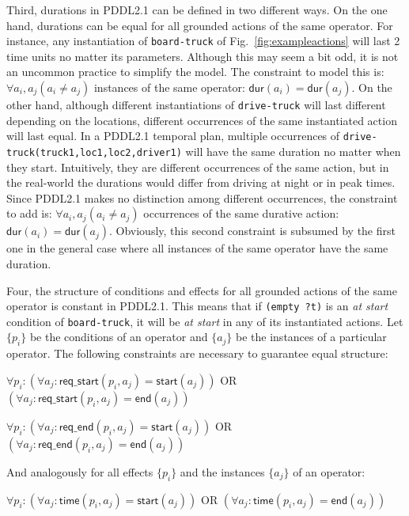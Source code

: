 \documentclass[runningheads]{llncs}
\newcommand{\dur}{\mathsf{dur}}    %
\newcommand{\start}{\mathsf{start}}%
\newcommand{\en}{\mathsf{end}}     %
\newcommand{\tim}{\mathsf{time}}   %
\newcommand{\reqs}{\mathsf{req\_{start}}} %
\newcommand{\reqe}{\mathsf{req\_{end}}}   %
\begin{document}


Third, durations in PDDL2.1 can be defined in two different ways. On the one hand, durations can be equal for all grounded actions of the same operator. For instance, any instantiation of \texttt{board-truck} of Fig.~\ref{fig:exampleactions} will last 2 time units no matter its parameters. Although this may seem a bit odd, it is not an uncommon practice to simplify the model. The constraint to model this is: $\forall a_i,a_j (a_i \neq a_j)$ instances of the same operator: $\dur(a_i) = \dur(a_j)$.
On the other hand, although different instantiations of \texttt{drive-truck} will last different depending on the locations, different occurrences of the same instantiated action will last equal.
In a PDDL2.1 temporal plan, multiple occurrences of \texttt{drive-truck(truck1,loc1,loc2,driver1)} will have the same duration no matter when they start. Intuitively, they are different occurrences of the same action, but in the real-world the durations would differ from driving at night or in peak times. Since PDDL2.1 makes no distinction among different occurrences, the constraint to add is: $\forall a_i,a_j (a_i \neq a_j)$ occurrences of the same durative action: $\dur(a_i) = \dur(a_j)$.
Obviously, this second constraint is subsumed by the first one in the general case where all instances of the same operator have the same duration.


Four, the structure of conditions and effects for all grounded actions of the same operator is constant in PDDL2.1. This means that if \texttt{(empty ?t)} is an \emph{at start} condition of \texttt{board-truck}, it will be \emph{at start} in any of its instantiated actions.
Let $\{p_i\}$ be the conditions of an operator and $\{a_j\}$ be the instances of a particular operator. The following constraints are necessary to guarantee equal structure:

$\forall p_i: (\forall a_j: \reqs(p_i,a_j) = \start(a_j))$ OR $(\forall a_j: \reqs(p_i,a_j) = \en(a_j))$

$\forall p_i: (\forall a_j: \reqe(p_i,a_j) = \start(a_j))$ OR $(\forall a_j: \reqe(p_i,a_j) = \en(a_j))$

And analogously for all effects $\{p_i\}$ and the instances $\{a_j\}$ of an operator:

$\forall p_i: (\forall a_j: \tim(p_i,a_j) = \start(a_j))$ OR $(\forall a_j: \tim(p_i,a_j) = \en(a_j))$
\end{document}
